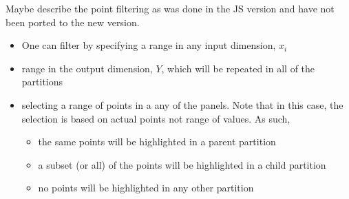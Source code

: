 Maybe describe the point filtering as was done in the JS version and have not been ported to the new version. 
\begin{itemize}
    \item One can filter by specifying a range in any input dimension, $x_i$
    \item range in the output dimension, $Y$, which will be repeated in all of the partitions
    \item selecting a range of points in a any of the panels. Note that in this case, the selection is based on actual points not range of values. As such, 
    \begin{itemize}
        \item the same points will be highlighted in a parent partition
        \item a subset (or all) of the points will be highlighted in a child partition
        \item no points will be highlighted in any other partition
    \end{itemize}
\end{itemize}
 

